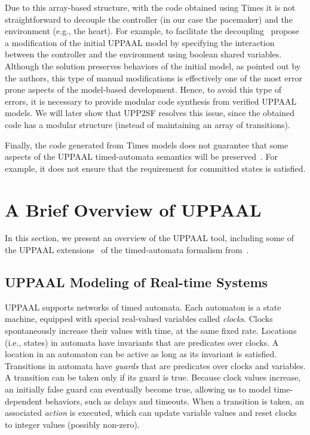 Due to this array-based structure, with the code obtained using Times it is not straightforward to decouple the controller (in our case the pacemaker) and the environment (e.g., the heart). For example, to facilitate the decoupling~\cite{kim_emsoft11} propose a modification of the initial UPPAAL model by specifying the interaction between the controller and the environment using boolean shared variables. 
Although the solution preserves behaviors of the initial model, as pointed out by the authors, this type of manual modifications is effectively one of the most error prone aspects of the model-based development. Hence, to avoid this type of errors, it is necessary to provide modular code synthesis from verified UPPAAL models. We will later show  that UPP2SF resolves this issue, since the obtained code has a modular structure (instead of maintaining an array of transitions).

Finally, the code generated from Times models does not guarantee that some aspects of the UPPAAL timed-automata semantics will be preserved~\cite{anaheed}. For example, it does not ensure that the requirement for committed states is satisfied. 


\section{A Brief Overview of UPPAAL}
\label{sec:uppaal}

In this section, we present an overview of the UPPAAL tool, including some of the UPPAAL extensions~\cite{uppaal,uppaal_tut,uppaal_wang} of the timed-automata formalism from~\cite{timed-aut}. 

\subsection{UPPAAL Modeling of Real-time Systems}

UPPAAL supports networks of timed automata. Each automaton is a state machine, equipped with special real-valued variables called \textit{clocks}. Clocks spontaneously increase their values with time, at the same fixed rate. Locations (i.e., states) in automata have invariants that are predicates over clocks. A location in an automaton can be active as long as its invariant is satisfied. Transitions in automata have \textit{guards} that are predicates over clocks and variables.  A transition can be taken only if its guard is true.  Because clock values increase, an initially false guard can eventually become true, allowing us to model time-dependent behaviors, such as delays and timeouts.  When a transition is taken, an associated \textit{action} is executed, which can update variable values and reset clocks to integer values (possibly non-zero). 

